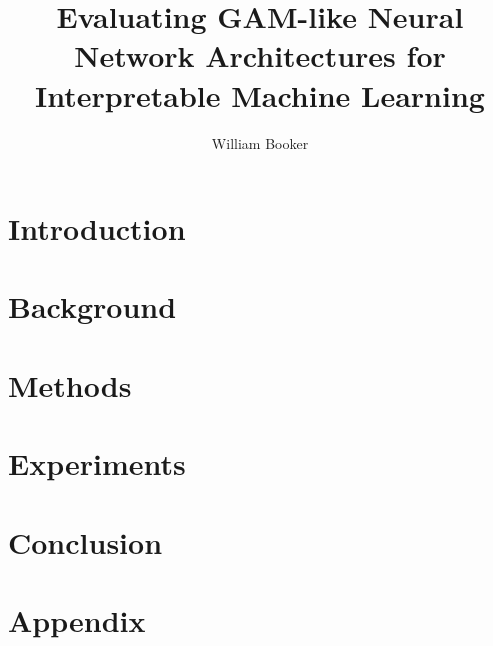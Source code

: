 \documentclass[12pt, thesis]{fmt/OUMastersThesis} %
\begin{document}
\title{Evaluating GAM-like Neural Network Architectures for Interpretable Machine Learning}
\author{William Booker}

\begin{preface}
   


\tableofcontents
\listoffigures



\end{preface}

\chapter{Introduction}
\label{chap:introduction}


\chapter{Background}
\label{chap:background}


\chapter{Methods}
\label{chap:methods}


\chapter{Experiments}







\chapter{Conclusion}
\label{chap:conclusion}


\OUsinglespace
{}

\chapter{Appendix}

\end{document}

